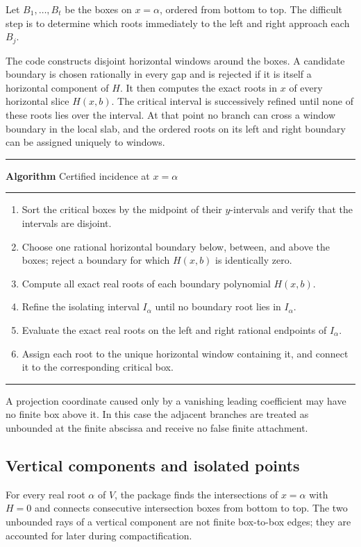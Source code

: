 \documentclass[11pt,a4paper]{article}
\newcounter{algorithm}
\newenvironment{reportalgorithm}[1]{%
  \refstepcounter{algorithm}%
  \par\medskip\noindent
  \begin{minipage}{\textwidth}
  \hrule\vspace{0.35em}
  \textbf{Algorithm \thealgorithm}\quad #1
  \vspace{0.2em}\hrule\vspace{0.35em}
  \begin{enumerate}[leftmargin=2em,itemsep=0.16em,topsep=0.2em]
}{%
  \end{enumerate}
  \vspace{0.1em}\hrule
  \end{minipage}
  \par\medskip
}
\begin{document}
Let $B_1,\ldots,B_t$ be the boxes on $x=\alpha$, ordered from bottom to top.
The difficult step is to determine which roots immediately to the left and
right approach each $B_j$.

The code constructs disjoint horizontal windows around the boxes. A candidate
boundary is chosen rationally in every gap and is rejected if it is itself a
horizontal component of $H$. It then computes the exact roots in $x$ of every
horizontal slice $H(x,b)$. The critical interval is successively refined until
none of these roots lies over the interval. At that point no branch can cross
a window boundary in the local slab, and the ordered roots on its left and
right boundary can be assigned uniquely to windows.

\begin{reportalgorithm}{Certified incidence at $x=\alpha$}
  \item Sort the critical boxes by the midpoint of their $y$-intervals and
        verify that the intervals are disjoint.
  \item Choose one rational horizontal boundary below, between, and above the
        boxes; reject a boundary for which $H(x,b)$ is identically zero.
  \item Compute all exact real roots of each boundary polynomial $H(x,b)$.
  \item Refine the isolating interval $I_\alpha$ until no boundary root lies
        in $I_\alpha$.
  \item Evaluate the exact real roots on the left and right rational endpoints
        of $I_\alpha$.
  \item Assign each root to the unique horizontal window containing it, and
        connect it to the corresponding critical box.
\end{reportalgorithm}

A projection coordinate caused only by a vanishing leading coefficient may
have no finite box above it. In this case the adjacent branches are treated as
unbounded at the finite abscissa and receive no false finite attachment.

\subsection{Vertical components and isolated points}

For every real root $\alpha$ of $V$, the package finds the intersections of
$x=\alpha$ with $H=0$ and connects consecutive intersection boxes from bottom
to top. The two unbounded rays of a vertical component are not finite
box-to-box edges; they are accounted for later during compactification.
\end{document}
